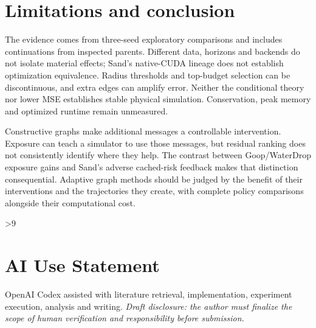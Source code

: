 \section{Limitations and conclusion}
The evidence comes from three-seed exploratory comparisons and includes continuations from inspected parents. Different data, horizons and backends do not isolate material effects; Sand's native-CUDA lineage does not establish optimization equivalence. Radius thresholds and top-budget selection can be discontinuous, and extra edges can amplify error. Neither the conditional theory nor lower MSE establishes stable physical simulation. Conservation, peak memory and optimized runtime remain unmeasured.

Constructive graphs make additional messages a controllable intervention. Exposure can teach a simulator to use those messages, but residual ranking does not consistently identify where they help. The contrast between Goop/WaterDrop exposure gains and Sand's adverse cached-risk feedback makes that distinction consequential. Adaptive graph methods should be judged by the benefit of their interventions and the trajectories they create, with complete policy comparisons alongside their computational cost.

\clearpage
{}
\ifnum\value{page}>9
  \PackageError{research-revision}{Main text exceeds the eight-page limit}{Shorten the main text before submission.}
\fi
\section*{AI Use Statement}
OpenAI Codex assisted with literature retrieval, implementation, experiment execution, analysis and writing. \textit{Draft disclosure: the author must finalize the scope of human verification and responsibility before submission.}

